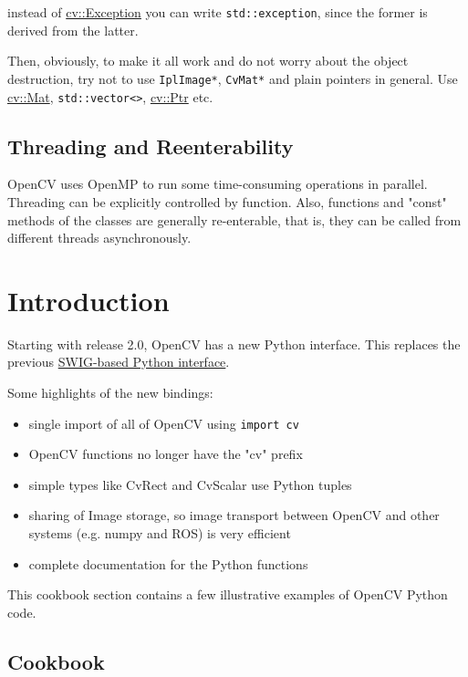instead of \hyperref[Exception]{cv::Exception} you can write \texttt{std::exception}, since the former is derived from the latter.

Then, obviously, to make it all work and do not worry about the object destruction, try not to use \texttt{IplImage*}, \texttt{CvMat*} and plain pointers in general. Use \hyperref[Mat]{cv::Mat}, \texttt{std::vector<>}, \hyperref[Ptr]{cv::Ptr} etc.

\section{Threading and Reenterability}

OpenCV uses OpenMP to run some time-consuming operations in parallel. Threading can be explicitly controlled by  function. Also, functions and "const" methods of the classes are generally re-enterable, that is, they can be called from different threads asynchronously.

\fi

\ifPy
\chapter{Introduction}

Starting with release 2.0, OpenCV has a new Python interface. This replaces the previous 
\href{http://opencv.willowgarage.com/wiki/SwigPythonInterface}{SWIG-based Python interface}.

Some highlights of the new bindings:

\begin{itemize}
\item{single import of all of OpenCV using \texttt{import cv}}
\item{OpenCV functions no longer have the "cv" prefix}
\item{simple types like CvRect and CvScalar use Python tuples}
\item{sharing of Image storage, so image transport between OpenCV and other systems (e.g. numpy and ROS) is very efficient}
\item{complete documentation for the Python functions}
\end{itemize}

This cookbook section contains a few illustrative examples of OpenCV Python code.

\section{Cookbook}

